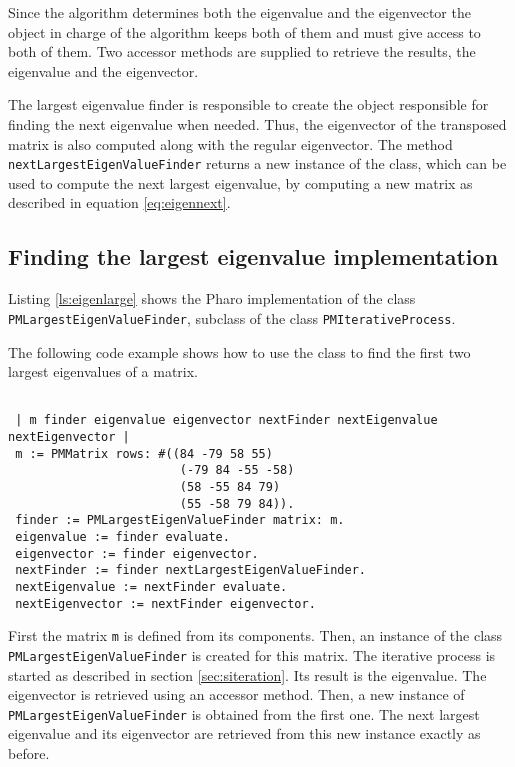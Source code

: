 \documentclass[twoside]{book}
\begin{document}
Since the algorithm determines both the eigenvalue and the
eigenvector the object in charge of the algorithm keeps both of
them and must give access to both of them. Two accessor methods
are supplied to retrieve the results, the eigenvalue and the
eigenvector.

The largest eigenvalue finder is responsible to create the object
responsible for finding the next eigenvalue when needed. Thus, the
eigenvector of the transposed matrix is also computed along with
the regular eigenvector. The method {\tt
nextLargestEigenValueFinder} returns a new instance of the class,
which can be used to compute the next largest eigenvalue, by
computing a new matrix as described in equation
\ref{eq:eigennext}.

\subsection{Finding the largest eigenvalue  implementation} Listing \ref{ls:eigenlarge} shows the Pharo
implementation of the  class {\tt PMLargestEigenValueFinder},
subclass of the class {\tt PMIterativeProcess}.

The following code example shows how to use the class to find the
first two largest eigenvalues of a matrix.
\begin{codeExample}
\begin{verbatim}

 | m finder eigenvalue eigenvector nextFinder nextEigenvalue nextEigenvector |
 m := PMMatrix rows: #((84 -79 58 55)
                        (-79 84 -55 -58)
                        (58 -55 84 79)
                        (55 -58 79 84)).
 finder := PMLargestEigenValueFinder matrix: m.
 eigenvalue := finder evaluate.
 eigenvector := finder eigenvector.
 nextFinder := finder nextLargestEigenValueFinder.
 nextEigenvalue := nextFinder evaluate.
 nextEigenvector := nextFinder eigenvector.
\end{verbatim}
\end{codeExample}
First the matrix {\tt m} is defined from its components. Then, an
instance of the class {\tt PMLargestEigenValueFinder} is created
for this matrix. The iterative process is started as described in
section \ref{sec:siteration}. Its result is the eigenvalue. The
eigenvector is retrieved using an accessor method. Then, a new
instance of {\tt PMLargestEigenValueFinder} is obtained from the
first one. The next largest eigenvalue and its eigenvector are
retrieved from this new instance exactly as before.
\end{document}

